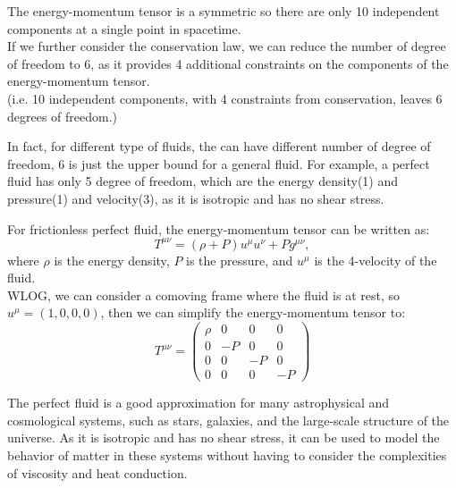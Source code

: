 \bigskip\noindent
\begin{importantnote}
  The energy-momentum tensor is a symmetric so there are only 10 independent components at a single point in spacetime.\\

  If we further consider the conservation law, we can reduce the number of degree of freedom to 6, as it provides 4 additional constraints on the components of the energy-momentum tensor.\\

  (i.e. 10 independent components, with 4 constraints from conservation, leaves 6 degrees of freedom.)
\end{importantnote}

\bigskip\noindent
\begin{remark}
  In fact, for different type of fluids, the can have different number of degree of freedom, 6 is just the upper bound for a general fluid. For example, a perfect fluid has only 5 degree of freedom, which are the energy density(1) and pressure(1) and velocity(3), as it is isotropic and has no shear stress.
\end{remark}

\newpage
\begin{theory}
  For frictionless perfect fluid, the energy-momentum tensor can be written as:
  \[
    T^{\mu\nu} = (\rho + P) u^\mu u^\nu + P g^{\mu\nu},
  \]
  where $\rho$ is the energy density, $P$ is the pressure, and $u^\mu$ is the 4-velocity of the fluid.\\
  WLOG, we can consider a comoving frame where the fluid is at rest, so $u^\mu = (1, 0, 0, 0)$, then we can simplify the energy-momentum tensor to:
  \[
    T^{\mu\nu} = \begin{pmatrix}
      \rho & 0 & 0 & 0 \\
      0 & -P & 0 & 0 \\
      0 & 0 & -P & 0 \\
      0 & 0 & 0 & -P
    \end{pmatrix}
  \]
\end{theory}

The perfect fluid is a good approximation for many astrophysical and cosmological systems, such as stars, galaxies, and the large-scale structure of the universe. As it is isotropic and has no shear stress, it can be used to model the behavior of matter in these systems without having to consider the complexities of viscosity and heat conduction. \\

